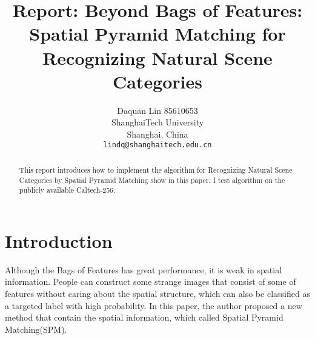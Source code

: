 \documentclass[10pt,twocolumn,letterpaper]{article}
\begin{document}
\title{Report: Beyond Bags of Features: Spatial Pyramid Matching for Recognizing Natural Scene Categories}

\author{Daquan Lin 85610653\\
ShanghaiTech University\\
Shanghai, China\\
{\tt\small lindq@shanghaitech.edu.cn}
}

\maketitle

\begin{abstract}
   This report introduces how to implement the algorithm for Recognizing Natural Scene Categories by Spatial Pyramid Matching show in this paper\cite{lazebnik2006beyond}. I test algorithm on the publicly available Caltech-256\cite{griffinHolubPerona}.

\end{abstract}

\section{Introduction}

Although the Bags of Features has great performance, it is weak in spatial information. People can construct some strange images that consist of some of features without caring about the spatial structure, which can also be classified as a targeted label with high probability. In this paper, the author proposed a new method that contain the spatial information, which called Spatial Pyramid Matching(SPM).


\end{document}
